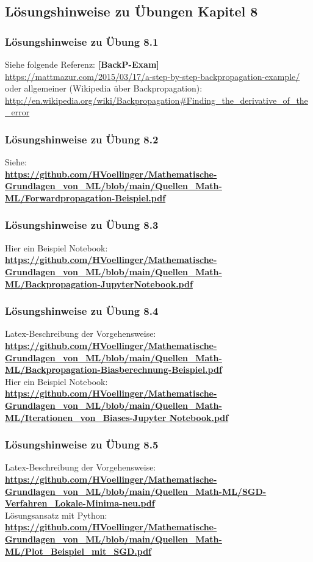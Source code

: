 \documentclass[12pt]{article}
\begin{document}
\newpage

\subsection{Lösungshinweise zu Übungen Kapitel 8}

\subsubsection{Lösungshinweise zu Übung 8.1}
%
Siehe folgende Referenz: \textbf{[BackP-Exam]}\\
\url{https://mattmazur.com/2015/03/17/a-step-by-step-backpropagation-example/} 
oder allgemeiner (Wikipedia über Backpropagation):\\
\url{http://en.wikipedia.org/wiki/Backpropagation#Finding_the_derivative_of_the_error}

\subsubsection{Lösungshinweise zu Übung 8.2}
Siehe:\\
\textbf{\url{https://github.com/HVoellinger/Mathematische-Grundlagen_von_ML/blob/main/Quellen_Math-ML/Forwardpropagation-Beispiel.pdf}}

\subsubsection{Lösungshinweise zu Übung 8.3}
Hier ein Beispiel Notebook:\\
\textbf{\url{https://github.com/HVoellinger/Mathematische-Grundlagen_von_ML/blob/main/Quellen_Math-ML/Backpropagation-JupyterNotebook.pdf}}  

\subsubsection{Lösungshinweise zu Übung 8.4}

Latex-Beschreibung der Vorgehensweise: \\
\textbf{\url{https://github.com/HVoellinger/Mathematische-Grundlagen_von_ML/blob/main/Quellen_Math-ML/Backpropagation-Biasberechnung-Beispiel.pdf}} \\[0.4cm]
%
Hier ein Beispiel Notebook:\\
\textbf{\url{https://github.com/HVoellinger/Mathematische-Grundlagen_von_ML/blob/main/Quellen_Math-ML/Iterationen_von_Biases-Jupyter Notebook.pdf}}  

\subsubsection{Lösungshinweise zu Übung 8.5}
Latex-Beschreibung der Vorgehensweise: \\
\textbf{\url{https://github.com/HVoellinger/Mathematische-Grundlagen_von_ML/blob/main/Quellen_Math-ML/SGD-Verfahren_Lokale-Minima-neu.pdf}} \\[0.2cm]
Lösungsansatz mit Python: \\[0.1cm]
\textbf{\url{https://github.com/HVoellinger/Mathematische-Grundlagen_von_ML/blob/main/Quellen_Math-ML/Plot_Beispiel_mit_SGD.pdf}} 
\end{document}
